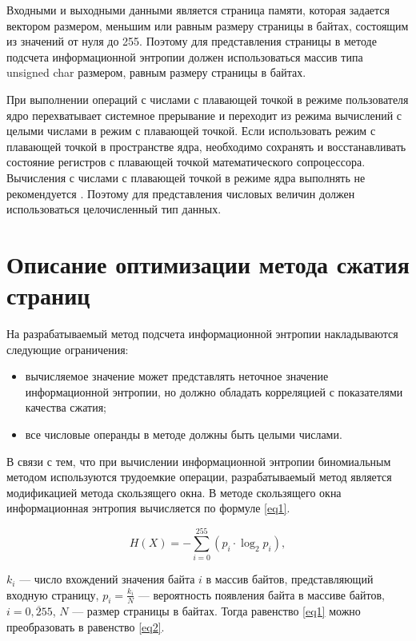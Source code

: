 Входными и выходными данными является страница памяти, которая задается вектором размером, меньшим или равным размеру страницы в байтах, состоящим из значений от нуля до 255. Поэтому для представления страницы в методе подсчета информационной энтропии должен использоваться массив типа unsigned char размером, равным размеру страницы в байтах.

При выполнении операций с числами с плавающей точкой в режиме пользователя ядро перехватывает системное прерывание и переходит из режима вычислений с целыми числами в режим с плавающей точкой. Если использовать режим с плавающей точкой в пространстве ядра, необходимо сохранять и восстанавливать состояние регистров с плавающей точкой математического сопроцессора. Вычисления с числами с плавающей точкой в режиме ядра выполнять не рекомендуется \cite{love}. Поэтому для представления числовых величин должен использоваться целочисленный тип данных. 

\section{Описание оптимизации метода сжатия страниц}

На разрабатываемый метод подсчета информационной энтропии накладываются следующие ограничения:

\begin{itemize}
	\item вычисляемое значение может представлять неточное значение информационной энтропии, но должно обладать корреляцией с показателями качества сжатия;
	\item все числовые операнды в методе должны быть целыми числами.
\end{itemize}

В связи с тем, что при вычислении информационной энтропии биномиальным методом используются трудоемкие операции, разрабатываемый метод является модификацией метода скользящего окна. В методе скользящего окна информационная энтропия вычисляется по формуле \ref{eq1}.

\begin{equation}\label{eq1}
	H(X) = -\sum_{i = 0}^{255} (p_{i} \cdot \log_{2}p_{i}),
\end{equation}

 $k_{i}$ --- число вхождений значения байта $i$ в массив байтов, представляющий входную страницу, $p_{i} = \frac{k_{i}}{N}$ --- вероятность появления байта в массиве байтов, $i = \overline{0, 255}$, $N$ --- размер страницы в байтах. Тогда равенство \ref{eq1} можно преобразовать в равенство \ref{eq2}.

